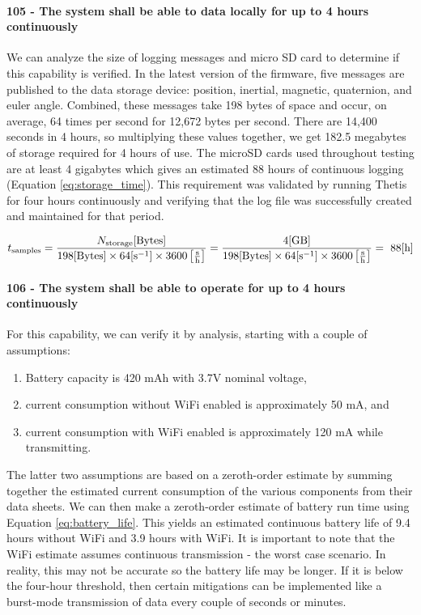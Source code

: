 \paragraph*{105 - The system shall be able to data locally for up to 4 hours continuously} We can analyze the size of logging messages and micro SD card to determine if this capability is verified.
In the latest version of the firmware, five messages are published to the data storage device: position, inertial, magnetic, quaternion, and euler angle.
Combined, these messages take 198 bytes of space and occur, on average, 64 times per second for 12,672 bytes per second.
There are 14,400 seconds in 4 hours, so multiplying these values together, we get 182.5 megabytes of storage required for 4 hours of use.
The microSD cards used throughout testing are at least 4 gigabytes which gives an estimated 88 hours of continuous logging (Equation \ref{eq:storage_time}).
This requirement was validated by running Thetis for four hours continuously and verifying that the log file was successfully created and maintained for that period.

\begin{equation} \labeq{storage_time}
    t_{\text{samples}} = \frac{N_{\text{storage}} [\text{Bytes}]}{198 [\text{Bytes}] \times 64 [\text{s}^{-1}] \times 3600 \left[\frac{\text{s}}{\text{h}}\right]} = \frac{4 [\text{GB}]}{198 [\text{Bytes}] \times 64 [\text{s}^{-1}] \times 3600 \left[\frac{\text{s}}{\text{h}}\right]} = ~88 [\text{h}]
\end{equation}

\paragraph*{106 - The system shall be able to operate for up to 4 hours continuously} For this capability, we can verify it by analysis, starting with a couple of assumptions:

\begin{enumerate}
    \item Battery capacity is 420 mAh with 3.7V nominal voltage,
    \item current consumption without WiFi enabled is approximately 50 mA, and
    \item current consumption with WiFi enabled is approximately 120 mA while transmitting.
\end{enumerate}

The latter two assumptions are based on a zeroth-order estimate by summing together the estimated current consumption of the various components from their data sheets.
We can then make a zeroth-order estimate of battery run time using Equation \ref{eq:battery_life}.
This yields an estimated continuous battery life of 9.4 hours without WiFi and 3.9 hours with WiFi.
It is important to note that the WiFi estimate assumes continuous transmission - the worst case scenario.
In reality, this may not be accurate so the battery life may be longer.
If it is below the four-hour threshold, then certain mitigations can be implemented like a burst-mode transmission of data every couple of seconds or minutes.


